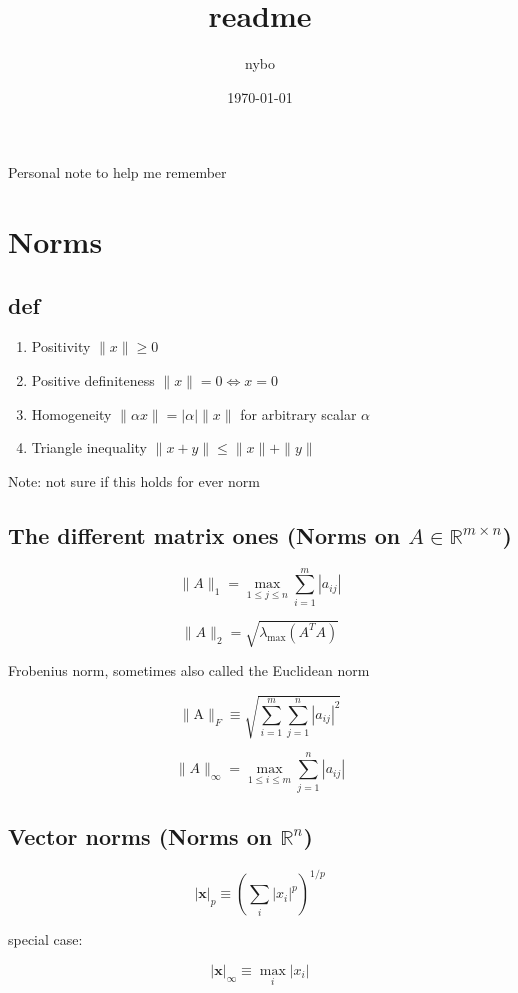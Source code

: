 \documentclass[12pt,a4paper]{article}
\author{nybo}
\date{\today}
\title{readme}
\begin{document}
\maketitle
\tableofcontents

Personal note to help me remember 

\section{Norms}
\label{sec-1}
\subsection*{def}
\label{sec-1-1}
\begin{enumerate}
\item Positivity  $\|x\| \geq 0$
\item Positive definiteness $\|x\|=0 \Longleftrightarrow x=0$
\item Homogeneity $\|\alpha x\|=|\alpha|\|x\|$ for arbitrary scalar $\alpha$
\item Triangle inequality $\|x+y\| \leq\|x\|+\|y\|$
\end{enumerate}
Note: not sure if this holds for ever norm
\subsection*{The different matrix ones (Norms on $A \in \mathbb{R}^{m \times n}$)}
\label{sec-1-2}
$$
\|A\|_{1}=\max _{1 \leq j \leq n} \sum_{i=1}^{m}\left|a_{i j}\right|
$$

$$
\|A\|_{2}=\sqrt{\lambda_{\max }\left(A^{T} A\right)}
$$

Frobenius norm, sometimes also called the Euclidean norm

$$
\|\mathrm{A}\|_{F} \equiv \sqrt{\sum_{i=1}^{m} \sum_{j=1}^{n}\left|a_{i j}\right|^{2}}
$$

$$
\|A\|_{\infty}=\max _{1 \leq i \leq m} \sum_{j=1}^{n}\left|a_{i j}\right|
$$
\subsection*{Vector norms (Norms on $\mathbb{R}^{n}$)}
\label{sec-1-3}

$$|\mathbf{x}|_{p} \equiv\left(\sum_{i}\left|x_{i}\right|^{p}\right)^{1 / p}$$

special case:

$$|\mathbf{x}|_{\infty} \equiv \max _{i}\left|x_{i}\right|$$
\end{document}
